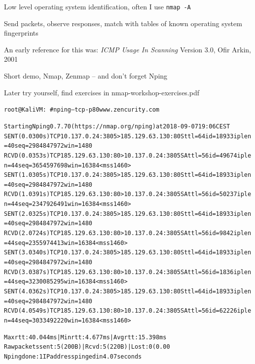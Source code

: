 \documentclass[Screen16to9,17pt]{foils}
\begin{document}
\begin{list2}
\item Low level operating system identification, often I use \verb+nmap -A+
\item Send packets, observe responses, match with tables of known operating system fingerprints
\item An early reference for this was: \emph{ICMP Usage In Scanning} Version 3.0,
  Ofir Arkin, 2001 %
\end{list2}



\begin{list2}
\item Short demo, Nmap, Zenmap -- and don't forget Nping
\item Later try yourself, find exercises in nmap-workshop-exercises.pdf
\end{list2}


\begin{alltt}\footnotesize
root@KaliVM:~# nping --tcp -p 80 www.zencurity.com

Starting Nping 0.7.70 ( https://nmap.org/nping ) at 2018-09-07 19:06 CEST
SENT (0.0300s) TCP 10.137.0.24:3805 > 185.129.63.130:80 S ttl=64 id=18933 iplen=40  seq=2984847972 win=1480
RCVD (0.0353s) TCP 185.129.63.130:80 > 10.137.0.24:3805 SA ttl=56 id=49674 iplen=44  seq=3654597698 win=16384 <mss 1460>
SENT (1.0305s) TCP 10.137.0.24:3805 > 185.129.63.130:80 S ttl=64 id=18933 iplen=40  seq=2984847972 win=1480
RCVD (1.0391s) TCP 185.129.63.130:80 > 10.137.0.24:3805 SA ttl=56 id=50237 iplen=44  seq=2347926491 win=16384 <mss 1460>
SENT (2.0325s) TCP 10.137.0.24:3805 > 185.129.63.130:80 S ttl=64 id=18933 iplen=40  seq=2984847972 win=1480
RCVD (2.0724s) TCP 185.129.63.130:80 > 10.137.0.24:3805 SA ttl=56 id=9842 iplen=44  seq=2355974413 win=16384 <mss 1460>
SENT (3.0340s) TCP 10.137.0.24:3805 > 185.129.63.130:80 S ttl=64 id=18933 iplen=40  seq=2984847972 win=1480
RCVD (3.0387s) TCP 185.129.63.130:80 > 10.137.0.24:3805 SA ttl=56 id=1836 iplen=44  seq=3230085295 win=16384 <mss 1460>
SENT (4.0362s) TCP 10.137.0.24:3805 > 185.129.63.130:80 S ttl=64 id=18933 iplen=40  seq=2984847972 win=1480
RCVD (4.0549s) TCP 185.129.63.130:80 > 10.137.0.24:3805 SA ttl=56 id=62226 iplen=44  seq=3033492220 win=16384 <mss 1460>

Max rtt: 40.044ms | Min rtt: 4.677ms | Avg rtt: 15.398ms
Raw packets sent: 5 (200B) | Rcvd: 5 (220B) | Lost: 0 (0.00%
Nping done: 1 IP address pinged in 4.07 seconds
\end{alltt}
\end{document}

